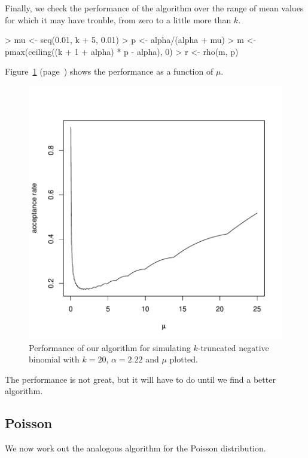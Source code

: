\documentclass[11pt]{article}
\begin{document}
Finally, we check the performance of the algorithm over the range of
mean values for which it may have trouble, from zero to a little more
than $k$.
\begin{Schunk}
\begin{Sinput}
> mu <- seq(0.01, k + 5, 0.01)
> p <- alpha/(alpha + mu)
> m <- pmax(ceiling((k + 1 + alpha) * p - alpha), 0)
> r <- rho(m, p)
\end{Sinput}
\end{Schunk}
Figure~\ref{fig:fig1} (page~\pageref{fig:fig1})
shows the performance as a function of $\mu$.
\begin{figure}
\begin{center}
\includegraphics{trunc-fig1}
\end{center}
\caption{Performance of our algorithm for simulating
$k$-truncated negative binomial with $k = 20$,
$\alpha = 2.22$ and $\mu$ plotted.}
\label{fig:fig1}
\end{figure}

The performance is not great, but it will have to do until we find
a better algorithm.

\subsection{Poisson}

We now work out the analogous algorithm for the Poisson distribution.
\end{document}

